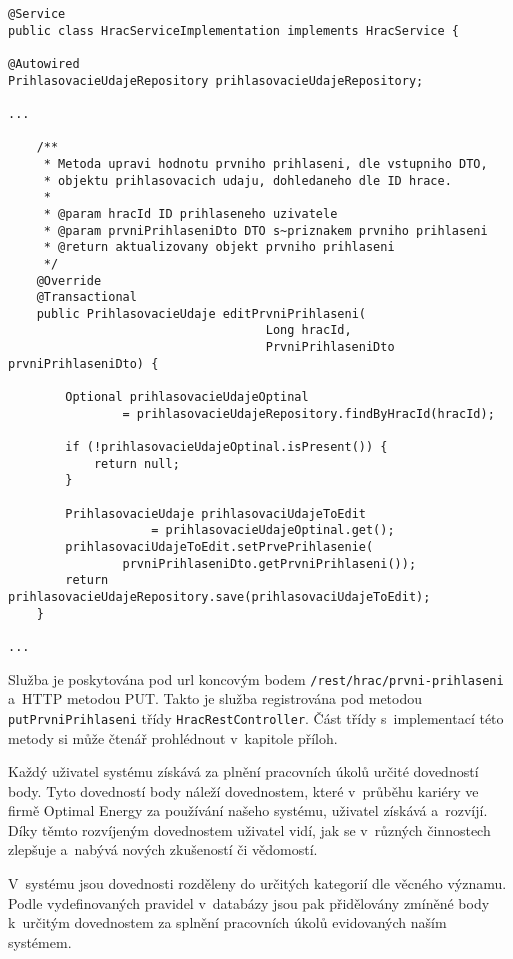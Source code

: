 \documentclass[twoside, 12pt]{article}
\begin{document}
{\clearpage

\begin{lstlisting}
@Service
public class HracServiceImplementation implements HracService {

@Autowired
PrihlasovacieUdajeRepository prihlasovacieUdajeRepository;

...

    /**
     * Metoda upravi hodnotu prvniho prihlaseni, dle vstupniho DTO,
     * objektu prihlasovacich udaju, dohledaneho dle ID hrace.
     *
     * @param hracId ID prihlaseneho uzivatele
     * @param prvniPrihlaseniDto DTO s~priznakem prvniho prihlaseni
     * @return aktualizovany objekt prvniho prihlaseni
     */
    @Override
    @Transactional
    public PrihlasovacieUdaje editPrvniPrihlaseni(
                                    Long hracId,
                                    PrvniPrihlaseniDto prvniPrihlaseniDto) {

        Optional prihlasovacieUdajeOptinal
                = prihlasovacieUdajeRepository.findByHracId(hracId);

        if (!prihlasovacieUdajeOptinal.isPresent()) {
            return null;
        }

        PrihlasovacieUdaje prihlasovaciUdajeToEdit
                    = prihlasovacieUdajeOptinal.get();
        prihlasovaciUdajeToEdit.setPrvePrihlasenie(
                prvniPrihlaseniDto.getPrvniPrihlaseni());
        return prihlasovacieUdajeRepository.save(prihlasovaciUdajeToEdit);
    }

...
\end{lstlisting}

Služba je poskytována pod url koncovým bodem \texttt{/rest/hrac/prvni-prihlaseni} a~HTTP metodou PUT.
Takto je služba registrována pod metodou \texttt{putPrvniPrihlaseni} třídy \texttt{HracRestController}.
Část třídy s~implementací této metody si může čtenář prohlédnout v~kapitole příloh.

\clearpage


Každý uživatel systému získává za plnění pracovních úkolů určité dovedností body.
Tyto dovedností body náleží dovednostem, které v~průběhu kariéry ve firmě Optimal Energy za používání našeho systému,
uživatel získává a~rozvíjí.
Díky těmto rozvíjeným dovednostem uživatel vidí,
jak se v~různých činnostech zlepšuje a~nabývá nových zkušeností či vědomostí.

V~systému jsou dovednosti rozděleny do určitých kategorií dle věcného významu.
Podle vydefinovaných pravidel v~databázy jsou pak přidělovány
zmíněné body k~určitým dovednostem za splnění pracovních úkolů evidovaných naším systémem.

}
\end{document}
